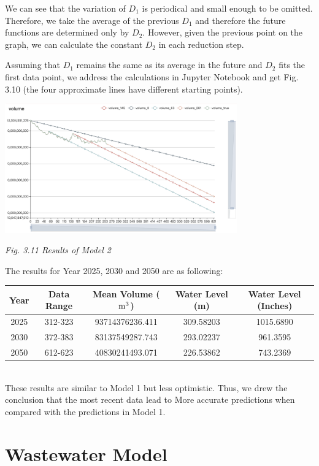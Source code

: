 \documentclass[12pt]{article}
\theoremstyle{definition}
\theoremstyle{remark}
\numberwithin{equation}{section}
\begin{document}
		We can see that the variation of $D_1$ is periodical and small enough to be omitted. Therefore, we take the average of the previous $D_1$ and therefore the future functions are determined only by $D_2$. However, given the previous point on the graph, we can calculate the constant $D_2$ in each reduction step. 

		Assuming that $D_1$ remains the same as its average in the future and $D_2$ fits the first data point, we address the calculations in Jupyter Notebook and get Fig. 3.10 (the four approximate lines have different starting points).

		\begin{center}
		\includegraphics[width=10cm]{3.11 Results of Model 2.jpg}

		\small \textit{Fig. 3.11 Results of Model 2}
		\end{center}

		The results for Year 2025, 2030 and 2050 are as following:
		~\\
		\begin{center}
		\begin{tabular}{ccccc}
			\hline
			Year&Data Range&Mean Volume ($\rm{m^3}$)&Water Level (m)&Water Level (Inches)\\
			\hline
			2025&312-323&93714376236.411&309.58203&1015.6890\\
			2030&372-383&83137549287.743&293.02237&961.3595\\
			2050&612-623&40830241493.071&226.53862&743.2369\\
			\hline
		\end{tabular}
		\end{center}
		~\\

		These results are similar to Model 1 but less optimistic. Thus, we drew the conclusion that the most recent data lead to More accurate predictions when compared with the predictions in Model 1.

\newpage
\section{Wastewater Model}
\end{document}
